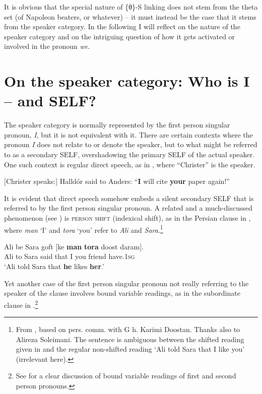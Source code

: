 \documentclass[output=paper]{LSP/langsci}
\begin{document}
It is obvious that the special nature of \{θ\}-S linking does not stem from the theta set (of Napoleon beaters, or whatever) – it must instead be the case that it stems from the speaker category. In the following I will reflect on the nature of the speaker category and on the intriguing question of how it gets activated or involved in the pronoun \textit{we}.

\section{On the speaker category: Who is I – and SELF?}\label{sec:Sigurdsson:3}

The speaker category is normally represented by the first person singular pronoun, \textit{I}, but it is not equivalent with it. There are certain contexts where the pronoun\textit{ I} does not relate to or denote the speaker, but to what might be referred to as a secondary SELF, overshadowing the primary SELF of the actual speaker. One such context is regular direct speech, as in , where “Christer” is the speaker.

\ea%
    \label{ex:Sigurdsson:12}
   [Christer speaks:]  Halldór said to Anders: “\textbf{I} will cite \textbf{your} paper again!”
\z

It is evident that direct speech somehow embeds a silent secondary SELF that is referred to by the first person singular pronoun. A related and a much-discussed phenomenon (see \citealt{Bianchi2003Syntax,Schlenker2003,Anand2006}) is \textsc{person shift} (indexical shift), as in the Persian clause in , where \textit{man} ‘I’ and \textit{tora} ‘you’ refer to \textit{Ali} and \textit{Sara}.\footnote{From \citealt{Sigurðsson2004}, based on pers. comm. with G h. Karimi Doostan. Thanks also to Alireza Soleimani. The sentence is ambiguous between the shifted reading given in  and the regular non-shifted reading ‘Ali told Sara that I like you’ (irrelevant here).}

\ea%
    \label{ex:Sigurdsson:13}

  Ali  be  Sara  goft  [ke  \textbf{man}  \textbf{tora}  doost  daram].\\
      {} Ali  to  Sara  said  that  I  you  friend  have.1\textsc{sg}\\
\glt  ‘Ali told Sara that \textbf{he} likes \textbf{her}.’
\z

Yet another case of the first person singular pronoun not really referring to the speaker of the clause involves bound variable readings, as in the subordinate clause in .\footnote{See \citealt{Rullmann2004} for a clear discussion of bound variable readings of first and second person pronouns.}
\end{document}
